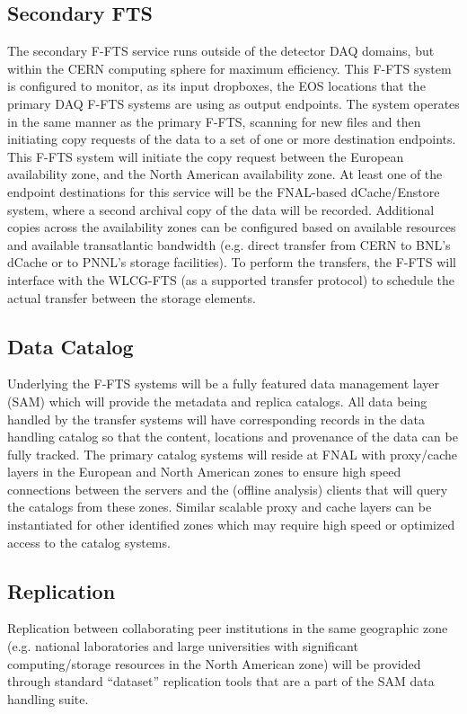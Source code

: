 \documentclass[pdftex,12pt,letter]{article}
\begin{document}
\subsection{Secondary FTS}
The secondary F-FTS service runs outside of the detector DAQ domains, but within the CERN computing sphere for maximum efficiency.
This F-FTS system is configured to monitor, as its input dropboxes, the EOS locations that the primary DAQ F-FTS systems are using as output endpoints.
The system operates in the same manner as the primary F-FTS, scanning for new files and then initiating copy requests of the data to a set of one or more destination endpoints.
This F-FTS system will initiate the copy request between the European availability zone, and the North American availability zone.  At least one of the endpoint destinations for
this service will be the FNAL-based dCache/Enstore system, where a second archival copy of the data will be recorded.  Additional copies across the availability zones can be
configured based on available resources and available transatlantic bandwidth (e.g. direct transfer from CERN to BNL’s dCache or to PNNL’s storage facilities). 
To perform the transfers, the F-FTS will interface with the WLCG-FTS (as a supported transfer protocol) to schedule the actual transfer between the storage elements.  



\subsection{Data Catalog}
Underlying the F-FTS systems will be a fully featured data management layer (SAM) which will provide the metadata and replica catalogs.
All data being handled by the transfer systems will have corresponding records in the data handling catalog so that the content,
locations and provenance of the data can be fully tracked.  The primary catalog systems will reside at FNAL with proxy/cache
layers in the European and North American zones to ensure high speed connections between the servers and the (offline analysis)
clients that will query the catalogs from these zones.  Similar scalable proxy and cache layers can be instantiated for other identified
zones which may require high speed or optimized access to the catalog systems.
 
\subsection{Replication}
Replication between collaborating peer institutions in the same geographic zone  (e.g. national laboratories and large universities with significant
computing/storage resources in the North American zone) will be provided through standard ``dataset'' replication tools that are a part
of the SAM data handling suite.
\end{document}

